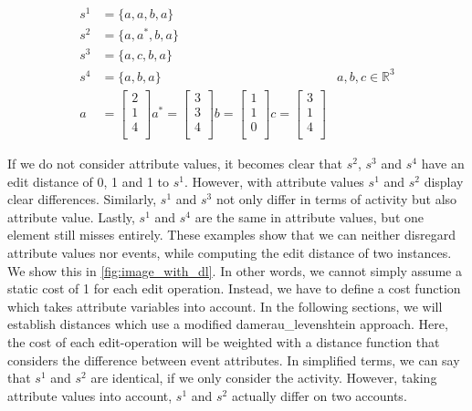 \documentclass[./../../paper.tex]{subfiles}
\begin{document}
\begin{align}
    \label{eq:dlexample}
    s^1 &=\{a,a,b,a\} \\
    s^2 &=\{a,a^*,b,a\}\\
    s^3 &=\{a,c,b,a\}\\
    s^4 &=\{a,b,a\}
    &a,b,c \in \mathbb{R}^3\\
    a &= \begin{bmatrix}
        2\\
        1\\
        4\\
    \end{bmatrix}
    a^* = \begin{bmatrix}
        3\\
        3\\
        4\\
    \end{bmatrix}
    b = \begin{bmatrix}
        1\\
        1\\
        0\\
    \end{bmatrix}
    c = \begin{bmatrix}
        3\\
        1\\
        4\\
    \end{bmatrix}
\end{align}

\noindent If we do not consider attribute values, it becomes clear that $s^2$, $s^3$ and $s^4$ have an edit distance of 0, 1 and 1 to $s^1$. However, with attribute values $s^1$ and $s^2$ display clear differences. Similarly, $s^1$ and $s^3$ not only differ in terms of activity but also attribute value. Lastly, $s^1$ and $s^4$ are the same in attribute values, but one element still misses entirely. These examples show that we can neither disregard attribute values nor events, while computing the edit distance of two \glspl{instance}. We show this in \autoref{fig:image_with_dl}. In other words, we cannot simply assume a static cost of 1 for each edit operation. Instead, we have to define a cost function which takes attribute variables into account. In the following sections, we will establish distances which use a modified \gls{damerau_levenshtein} approach. Here, the cost of each edit-operation will be weighted with a distance function that considers the difference between event attributes. In simplified terms, we can say that $s^1$ and $s^2$ are identical, if we only consider the activity. However, taking attribute values into account, $s^1$ and $s^2$ actually differ on two accounts. 
\end{document}
